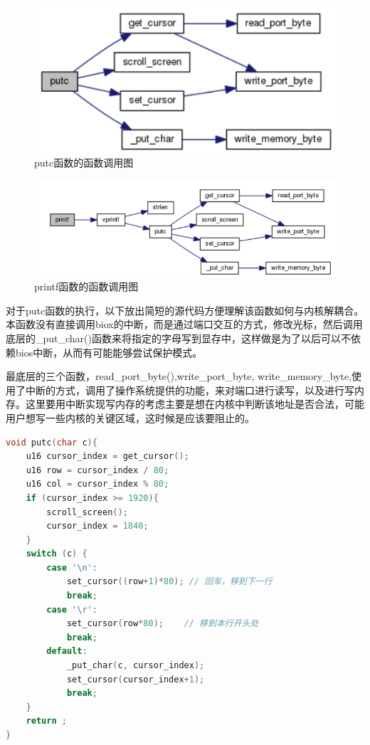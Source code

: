 \documentclass[forprint]{WHUBachelor}
\begin{document}
\begin{figure}[htp]
  \centering
  \includegraphics[width=13cm]{"./figure/putc-call-graph.png"}
  \caption{putc函数的函数调用图}
  \label{fig:putc}
\end{figure}

\begin{figure}[htp]
  \centering
  \includegraphics[width=13cm]{"./figure/printf-call-graph.png"}
  \caption{printf函数的函数调用图}
  \label{fig:printf}
\end{figure}

对于putc函数的执行，以下放出简短的源代码方便理解该函数如何与内核解耦合。
本函数没有直接调用biox的中断，而是通过端口交互的方式，修改光标，然后调用底层的\_put\_char()函数来将指定的字母写到显存中，这样做是为了以后可以不依赖bios中断，从而有可能能够尝试保护模式。

最底层的三个函数，read\_port\_byte(),write\_port\_byte, write\_memory\_byte,使用了中断的方式，调用了操作系统提供的功能，来对端口进行读写，以及进行写内存。这里要用中断实现写内存的考虑主要是想在内核中判断该地址是否合法，可能用户想写一些内核的关键区域，这时候是应该要阻止的。

\begin{lstlisting}[language=c]
void putc(char c){
    u16 cursor_index = get_cursor();
    u16 row = cursor_index / 80;
    u16 col = cursor_index % 80;
    if (cursor_index >= 1920){
        scroll_screen();
        cursor_index = 1840;
    }
    switch (c) {
        case '\n':
            set_cursor((row+1)*80); // 回车，移到下一行
            break;
        case '\r':
            set_cursor(row*80);    // 移到本行开头处
            break;
        default:
            _put_char(c, cursor_index);
            set_cursor(cursor_index+1);
            break;
    }
    return ;
}
\end{lstlisting}
\end{document}
